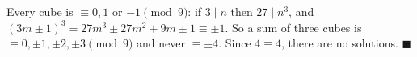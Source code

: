 Every cube is $\equiv0,1$ or $-1\pmod9$: if $3\mid n$ then $27\mid n^3$, and $(3m\pm1)^3=27m^3\pm27m^2+9m\pm1\equiv\pm1$. So a sum of three cubes is $\equiv0,\pm1,\pm2,\pm3\pmod9$ and never $\equiv\pm4$. Since $4\equiv4$, there are no solutions. $\blacksquare$
